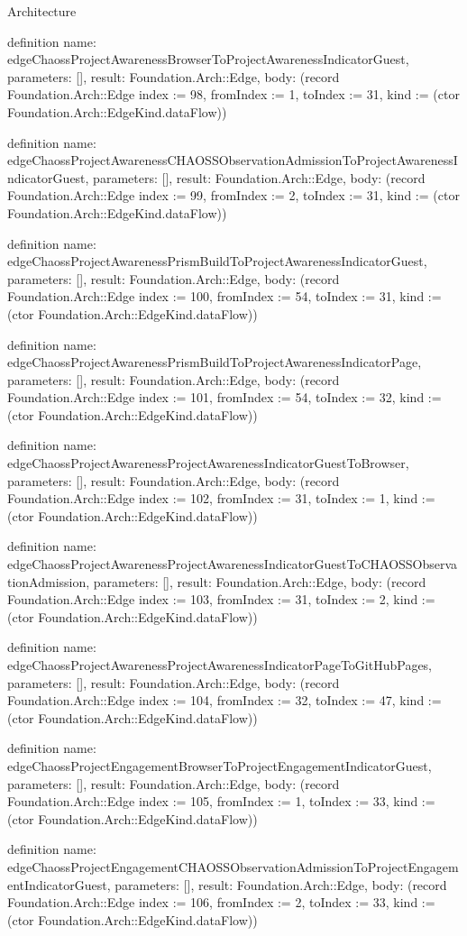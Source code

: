 \begin{lexlean}{Architecture}
\begin{semanticmodule}
definition{
  name: edgeChaossProjectAwarenessBrowserToProjectAwarenessIndicatorGuest,
  parameters: [],
  result: Foundation.Arch::Edge,
  body: (record Foundation.Arch::Edge {index := 98, fromIndex := 1, toIndex := 31, kind := (ctor Foundation.Arch::EdgeKind.dataFlow)})
}

definition{
  name: edgeChaossProjectAwarenessCHAOSSObservationAdmissionToProjectAwarenessIndicatorGuest,
  parameters: [],
  result: Foundation.Arch::Edge,
  body: (record Foundation.Arch::Edge {index := 99, fromIndex := 2, toIndex := 31, kind := (ctor Foundation.Arch::EdgeKind.dataFlow)})
}

definition{
  name: edgeChaossProjectAwarenessPrismBuildToProjectAwarenessIndicatorGuest,
  parameters: [],
  result: Foundation.Arch::Edge,
  body: (record Foundation.Arch::Edge {index := 100, fromIndex := 54, toIndex := 31, kind := (ctor Foundation.Arch::EdgeKind.dataFlow)})
}

definition{
  name: edgeChaossProjectAwarenessPrismBuildToProjectAwarenessIndicatorPage,
  parameters: [],
  result: Foundation.Arch::Edge,
  body: (record Foundation.Arch::Edge {index := 101, fromIndex := 54, toIndex := 32, kind := (ctor Foundation.Arch::EdgeKind.dataFlow)})
}

definition{
  name: edgeChaossProjectAwarenessProjectAwarenessIndicatorGuestToBrowser,
  parameters: [],
  result: Foundation.Arch::Edge,
  body: (record Foundation.Arch::Edge {index := 102, fromIndex := 31, toIndex := 1, kind := (ctor Foundation.Arch::EdgeKind.dataFlow)})
}

definition{
  name: edgeChaossProjectAwarenessProjectAwarenessIndicatorGuestToCHAOSSObservationAdmission,
  parameters: [],
  result: Foundation.Arch::Edge,
  body: (record Foundation.Arch::Edge {index := 103, fromIndex := 31, toIndex := 2, kind := (ctor Foundation.Arch::EdgeKind.dataFlow)})
}

definition{
  name: edgeChaossProjectAwarenessProjectAwarenessIndicatorPageToGitHubPages,
  parameters: [],
  result: Foundation.Arch::Edge,
  body: (record Foundation.Arch::Edge {index := 104, fromIndex := 32, toIndex := 47, kind := (ctor Foundation.Arch::EdgeKind.dataFlow)})
}

definition{
  name: edgeChaossProjectEngagementBrowserToProjectEngagementIndicatorGuest,
  parameters: [],
  result: Foundation.Arch::Edge,
  body: (record Foundation.Arch::Edge {index := 105, fromIndex := 1, toIndex := 33, kind := (ctor Foundation.Arch::EdgeKind.dataFlow)})
}

definition{
  name: edgeChaossProjectEngagementCHAOSSObservationAdmissionToProjectEngagementIndicatorGuest,
  parameters: [],
  result: Foundation.Arch::Edge,
  body: (record Foundation.Arch::Edge {index := 106, fromIndex := 2, toIndex := 33, kind := (ctor Foundation.Arch::EdgeKind.dataFlow)})
}


\end{semanticmodule}
\end{lexlean}

